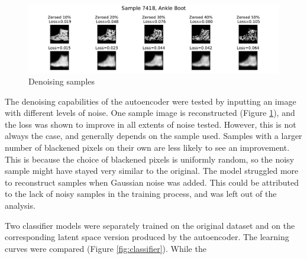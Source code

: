 \documentclass[11pt]{article} %
\begin{document}
\begin{figure}[b]
    \centering
    \includegraphics[width=\textwidth]{res/Reconstruction.pdf}
    \caption{Denoising samples}
    \label{fig:recon}
\end{figure}


\noindent The denoising capabilities of the autoencoder were tested by inputting an image with different levels of noise. One sample image is reconstructed (Figure \ref{fig:recon}), and the loss was shown to improve in all extents of noise tested. However, this is not always the case, and generally depends on the sample used. Samples with a larger number of blackened pixels on their own are less likely to see an improvement. This is because the choice of blackened pixels is uniformly random, so the noisy sample might have stayed very similar to the original. The model struggled more to reconstruct samples when Gaussian noise was added. This could be attributed to the lack of noisy samples in the training process, and was left out of the analysis.

Two classifier models were separately trained on the original dataset and on the corresponding latent space version produced by the autoencoder. The learning curves were compared (Figure \ref{fig:classifier}). While the 


\pagebreak
\end{document}
